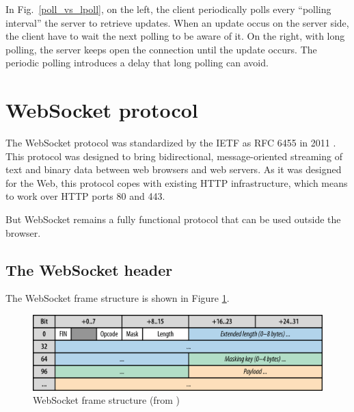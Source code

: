 \documentclass[journal,compsoc]{IEEEtran}
\newcommand{\ws}{WebSocket}
\begin{document}
In Fig.~\ref{poll_vs_lpoll}, on the left, the client periodically polls every ``polling interval'' the server to retrieve updates. When an update occus on the server side, the client have to wait the next polling to be aware of it. On the right, with long polling, the server keeps open the connection until the update occurs. The periodic polling introduces a delay that long polling can avoid.

\section{\ws{} protocol}
The \ws{} protocol was standardized by the IETF as RFC 6455 in 2011 \cite{rfc6455}.
This protocol was designed to bring bidirectional, message-oriented streaming of text and binary data between web browsers and web servers.
As it was designed for the Web, this protocol copes with existing HTTP infrastructure, which means to work over HTTP ports 80 and 443.

But \ws{} remains a fully functional protocol that can be used outside the browser.

\subsection{The \ws{} header}

The \ws{} frame structure is shown in Figure \ref{fig:websocket_frame}.

\begin{figure}
    \centering
    \includegraphics[width=\linewidth]{websocket_frame.png}
    \caption{\ws{} frame structure (from \cite{HighPerfBrowserNetworking:websocket})}
        \label{fig:websocket_frame}
\end{figure}
\end{document}
